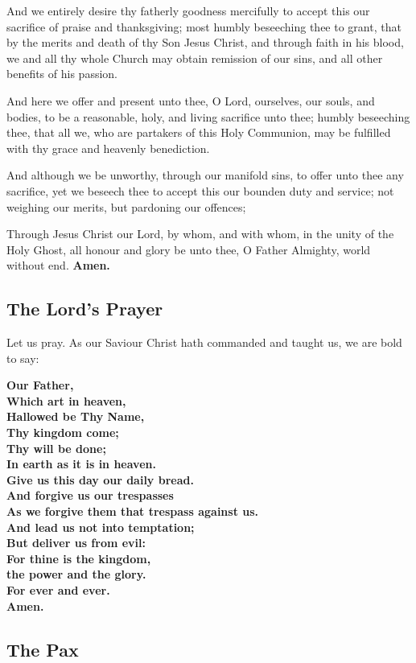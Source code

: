 And we entirely desire thy fatherly goodness mercifully to accept this our
sacrifice of praise and thanksgiving; most humbly beseeching thee to grant,
that by the merits and death of thy Son Jesus Christ, and through faith in his
blood, we and all thy whole Church may obtain remission of our sins, and all
other benefits of his passion.

And here we offer and present unto thee, O Lord, ourselves, our souls, and
bodies, to be a reasonable, holy, and living sacrifice unto thee; humbly
beseeching thee, that all we, who are partakers of this Holy Communion, may
be fulfilled with thy grace and heavenly benediction.

And although we be unworthy, through our manifold sins, to offer unto thee
any sacrifice, yet we beseech thee to accept this our bounden duty and service;
not weighing our merits, but pardoning our offences;

Through Jesus Christ our Lord, by whom, and with whom, in the unity of the
Holy Ghost, all honour and glory be unto thee, O Father Almighty, world
without end. \textbf{Amen.}

\subsection{The Lord's Prayer}

Let us pray. As our Saviour Christ hath commanded and taught us, we are bold to say:

\textbf{Our Father,\\
Which art in heaven,\\
Hallowed be Thy Name,\\
Thy kingdom come;\\
Thy will be done;\\
In earth as it is in heaven.\\
Give us this day our daily bread.\\
And forgive us our trespasses\\
As we forgive them that trespass against us.\\
And lead us not into temptation;\\
But deliver us from evil:\\
For thine is the kingdom,\\
the power and the glory.\\
For ever and ever. \\
Amen.}

\subsection{The Pax}

